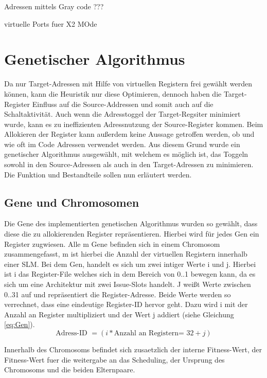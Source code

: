 Adressen mittels Gray code ???

virtuelle Ports fuer X2 MOde


\section{Genetischer Algorithmus}
\label{sec:genetischerAlgorithmus}
Da nur Target-Adressen mit Hilfe von virtuellen Registern frei gewählt werden können, kann die Heuristik nur diese Optimieren, dennoch haben die Target-Register Einfluss auf die Source-Addressen und somit auch auf die Schaltaktivität. Auch wenn die Adresstoggel der Target-Regsiter minimiert wurde, kann es zu ineffizienten Adressnutzung der Source-Register kommen. Beim Allokieren der Register kann außerdem keine Aussage getroffen werden, ob und wie oft im Code Adressen verwendet werden. Aus diesem Grund wurde ein genetischer Algorithmus ausgewählt, mit welchem es möglich ist, das Toggeln sowohl in den Source-Adressen als auch in den Target-Adressen zu minimieren. Die Funktion und Bestandteile sollen nun erläutert werden.

\subsection{Gene und Chromosomen}
Die Gene des implementierten genetischen Algorithmus wurden so gewählt, dass diese die zu allokierenden Register repräsentieren. Hierbei wird für jedes Gen ein Register zugwiesen.
Alle m Gene befinden sich in einem Chromosom zusammengefasst, m ist hierbei die Anzahl der virtuellen Registern innerhalb einer SLM. Bei dem Gen, handelt es sich um zwei intiger Werte i und j. Hierbei ist i das Register-File welches sich in dem Bereich von 0..1 bewegen kann, da es sich um eine Architektur mit zwei Issue-Slots handelt. J weißt Werte zwischen 0..31 auf und repräsentiert die Register-Adresse. Beide Werte werden so verrechnet, dass eine eindeutige Register-ID hervor geht. Dazu wird i mit der Anzahl an Register multipliziert und der Wert j addiert (siehe Gleichung \ref{eq:Gen}). 
\begin{equation}
\text{Adress-ID }= (i* \text{Anzahl an Registern= 32}+ j)
\label{eq:Gen}
\end{equation}
 
 Innerhalb des Chromosoms befindet sich zusaetzlich der interne Fitness-Wert, der Fitness-Wert fuer die weitergabe an das Scheduling, der Ursprung des Chromosoms und die beiden Elternpaare.
  
 
